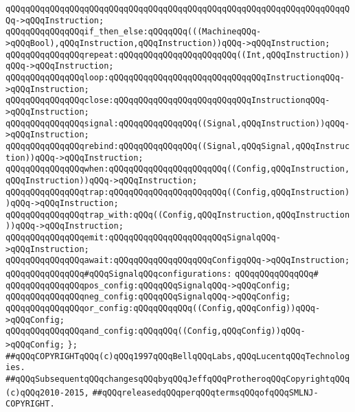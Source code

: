 \verb|qQQqqQQqqQQqqQQqqQQqqQQqqQQqqQQqqQQqqQQqqQQqqQQqqQQqqQQqqQQqqQQqqQQqqQQq->qQQqInstruction;|\newline
\newline
\verb|qQQqqQQqqQQqqQQqif_then_else:qQQqqQQq(((MachineqQQq->qQQqBool),qQQqInstruction,qQQqInstruction))qQQq->qQQqInstruction;|\newline
\verb|qQQqqQQqqQQqqQQqrepeat:qQQqqQQqqQQqqQQqqQQqqQQq((Int,qQQqInstruction))qQQq->qQQqInstruction;|\newline
\verb|qQQqqQQqqQQqqQQqloop:qQQqqQQqqQQqqQQqqQQqqQQqqQQqqQQqInstructionqQQq->qQQqInstruction;|\newline
\verb|qQQqqQQqqQQqqQQqclose:qQQqqQQqqQQqqQQqqQQqqQQqqQQqInstructionqQQq->qQQqInstruction;|\newline
\newline
\verb|qQQqqQQqqQQqqQQqsignal:qQQqqQQqqQQqqQQq((Signal,qQQqInstruction))qQQq->qQQqInstruction;|\newline
\verb|qQQqqQQqqQQqqQQqrebind:qQQqqQQqqQQqqQQq((Signal,qQQqSignal,qQQqInstruction))qQQq->qQQqInstruction;|\newline
\verb|qQQqqQQqqQQqqQQqwhen:qQQqqQQqqQQqqQQqqQQqqQQq((Config,qQQqInstruction,qQQqInstruction))qQQq->qQQqInstruction;|\newline
\verb|qQQqqQQqqQQqqQQqtrap:qQQqqQQqqQQqqQQqqQQqqQQq((Config,qQQqInstruction))qQQq->qQQqInstruction;|\newline
\verb|qQQqqQQqqQQqqQQqtrap_with:qQQq((Config,qQQqInstruction,qQQqInstruction))qQQq->qQQqInstruction;|\newline
\verb|qQQqqQQqqQQqqQQqemit:qQQqqQQqqQQqqQQqqQQqqQQqSignalqQQq->qQQqInstruction;|\newline
\verb|qQQqqQQqqQQqqQQqawait:qQQqqQQqqQQqqQQqqQQqConfigqQQq->qQQqInstruction;|\newline
\newline
\verb|qQQqqQQqqQQqqQQq#qQQqSignalqQQqconfigurations:|\newline
\verb|qQQqqQQqqQQqqQQq#|\newline
\verb|qQQqqQQqqQQqqQQqpos_config:qQQqqQQqSignalqQQq->qQQqConfig;|\newline
\verb|qQQqqQQqqQQqqQQqneg_config:qQQqqQQqSignalqQQq->qQQqConfig;|\newline
\verb|qQQqqQQqqQQqqQQqor_config:qQQqqQQqqQQq((Config,qQQqConfig))qQQq->qQQqConfig;|\newline
\verb|qQQqqQQqqQQqqQQqand_config:qQQqqQQq((Config,qQQqConfig))qQQq->qQQqConfig;|\newline
\newline
\verb|};|\newline
\newline
\newline
\verb|##qQQqCOPYRIGHTqQQq(c)qQQq1997qQQqBellqQQqLabs,qQQqLucentqQQqTechnologies.|\newline
\verb|##qQQqSubsequentqQQqchangesqQQqbyqQQqJeffqQQqProtheroqQQqCopyrightqQQq(c)qQQq2010-2015,|\newline
\verb|##qQQqreleasedqQQqperqQQqtermsqQQqofqQQqSMLNJ-COPYRIGHT.|\newline

